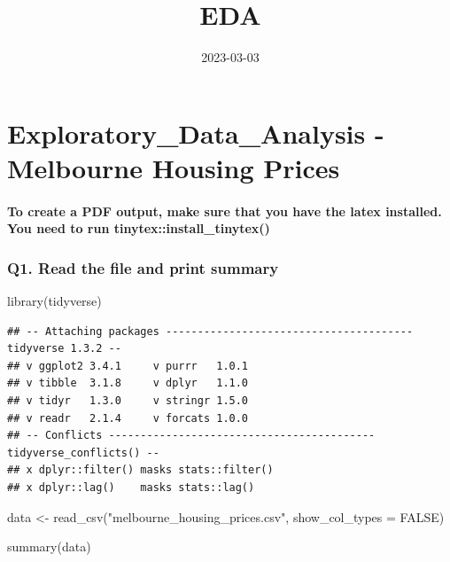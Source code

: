 \documentclass[
]{article}
\title{EDA}
\author{}
\date{\vspace{-2.5em}2023-03-03}
\newenvironment{Shaded}{\begin{snugshade}}{\end{snugshade}}
\newcommand{\AttributeTok}[1]{\textcolor[rgb]{0.77,0.63,0.00}{#1}}
\newcommand{\ConstantTok}[1]{\textcolor[rgb]{0.00,0.00,0.00}{#1}}
\newcommand{\FunctionTok}[1]{\textcolor[rgb]{0.00,0.00,0.00}{#1}}
\newcommand{\NormalTok}[1]{#1}
\newcommand{\OtherTok}[1]{\textcolor[rgb]{0.56,0.35,0.01}{#1}}
\newcommand{\StringTok}[1]{\textcolor[rgb]{0.31,0.60,0.02}{#1}}
\begin{document}
\maketitle

\hypertarget{exploratory_data_analysis---melbourne-housing-prices}{%
\section{Exploratory\_Data\_Analysis - Melbourne Housing
Prices}\label{exploratory_data_analysis---melbourne-housing-prices}}

\hypertarget{to-create-a-pdf-output-make-sure-that-you-have-the-latex-installed.-you-need-to-run-tinytexinstall_tinytex}{%
\paragraph{To create a PDF output, make sure that you have the latex
installed. You need to run
tinytex::install\_tinytex()}\label{to-create-a-pdf-output-make-sure-that-you-have-the-latex-installed.-you-need-to-run-tinytexinstall_tinytex}}

\hypertarget{q1.-read-the-file-and-print-summary}{%
\subsubsection{Q1. Read the file and print
summary}\label{q1.-read-the-file-and-print-summary}}

\begin{Shaded}
\begin{Highlighting}[]
\FunctionTok{library}\NormalTok{(tidyverse)}
\end{Highlighting}
\end{Shaded}

\begin{verbatim}
## -- Attaching packages --------------------------------------- tidyverse 1.3.2 --
## v ggplot2 3.4.1     v purrr   1.0.1
## v tibble  3.1.8     v dplyr   1.1.0
## v tidyr   1.3.0     v stringr 1.5.0
## v readr   2.1.4     v forcats 1.0.0
## -- Conflicts ------------------------------------------ tidyverse_conflicts() --
## x dplyr::filter() masks stats::filter()
## x dplyr::lag()    masks stats::lag()
\end{verbatim}

\begin{Shaded}
\begin{Highlighting}[]
\NormalTok{data }\OtherTok{\textless{}{-}} \FunctionTok{read\_csv}\NormalTok{(}\StringTok{"melbourne\_housing\_prices.csv"}\NormalTok{, }\AttributeTok{show\_col\_types =} \ConstantTok{FALSE}\NormalTok{)}

\FunctionTok{summary}\NormalTok{(data)}
\end{Highlighting}
\end{Shaded}
\end{document}
